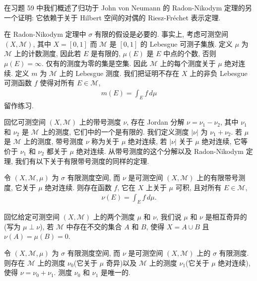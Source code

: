 \documentclass[../../main.tex]{subfiles}
\begin{document}
在习题 59 中我们概述了归功于 John von Neumann 的 Radon-Nikodym 定理的另一个证明: 它依赖于关于 Hilbert 空间的对偶的 Riesz-Fr\'echet 表示定理.

\begin{example}\label{example:ch18-rn-sigma-finite-necessary}
在 Radon-Nikodym 定理中 $\sigma$ 有限的假设是必要的. 事实上, 考虑可测空间 $(X,\mathcal{M})$, 其中 $X=[0,1]$ 而 $\mathcal{M}$ 是 $[0,1]$ 的 Lebesgue 可测子集族. 定义 $\mu$ 为 $\mathcal{M}$ 上的计数测度, 因此若 $E$ 是有限的, $\mu(E)$ 是 $E$ 中点的个数, 否则 $\mu(E)=\infty$. 仅有的测度为零的集是空集. 因此 $\mathcal{M}$ 上的每个测度关于 $\mu$ 绝对连续. 定义 $m$ 为 $\mathcal{M}$ 上的 Lebesgue 测度. 我们把证明不存在 $X$ 上的非负 Lebesgue 可测函数 $f$ 使得对所有 $E\in\mathcal{M}$,
\begin{align*}
m(E)=\int_{E}f\,d\mu
\end{align*}
留作练习.
\end{example}

回忆可测空间 $(X,\mathcal{M})$ 上的带号测度 $\nu$, 存在 Jordan 分解 $\nu=\nu_{1}-\nu_{2}$, 其中 $\nu_{1}$ 和 $\nu_{2}$ 是 $\mathcal{M}$ 上的测度, 它们中的一个是有限的. 我们定义测度 $|\nu|$ 为 $\nu_{1}+\nu_{2}$. 若 $\mu$ 是 $\mathcal{M}$ 上的测度, 带号测度 $\nu$ 称为关于 $\mu$ 绝对连续, 若 $|\nu|$ 关于 $\mu$ 绝对连续, 它等价于 $\nu_{1}$ 和 $\nu_{2}$ 都关于 $\mu$ 绝对连续. 从带号测度的这个分解以及 Radon-Nikodym 定理, 我们有以下关于有限带号测度的同样的定理.

\begin{corollary}\label{corollary:ch18-rn-signed}
令 $(X,\mathcal{M},\mu)$ 为 $\sigma$ 有限测度空间, 而 $\nu$ 是可测空间 $(X,\mathcal{M})$ 上的有限带号测度, 它关于 $\mu$ 绝对连续. 则存在函数 $f$, 它在 $X$ 上关于 $\mu$ 可积, 且对所有 $E\in\mathcal{M}$,
\begin{align*}
\nu(E)=\int_{E}f\,d\mu.
\end{align*}
\end{corollary}

回忆给定可测空间 $(X,\mathcal{M})$ 上的两个测度 $\mu$ 和 $\nu$, 我们说 $\mu$ 和 $\nu$ 是相互奇异的(写为 $\mu\perp\nu$), 若 $\mathcal{M}$ 中存在不交的集合 $A$ 和 $B$, 使得 $X=A\cup B$ 且 $\nu(A)=\mu(B)=0$.

\begin{theorem}\label{theorem:ch18-lebesgue-decomposition}
令 $(X,\mathcal{M},\mu)$ 为 $\sigma$ 有限测度空间, 而 $\nu$ 是可测空间 $(X,\mathcal{M})$ 上的 $\sigma$ 有限测度. 则存在 $\mathcal{M}$ 上的测度 $\nu_{0}$(它关于 $\mu$ 奇异)以及 $\mathcal{M}$ 上的测度 $\nu_{1}$(它关于 $\mu$ 绝对连续), 使得 $\nu=\nu_{0}+\nu_{1}$. 测度 $\nu_{0}$ 和 $\nu_{1}$ 是唯一的.
\end{theorem}
\end{document}
